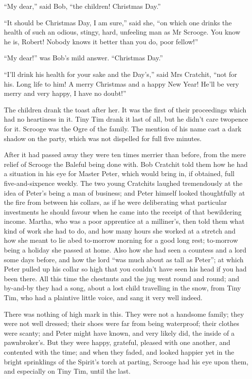 \documentclass[paper=5.5in:8.5in,BCOR=5mm,twoside,DIV=calc,12pt,usegeometry]{scrbook} %
\begin{document}
\enquote{My dear,} said Bob, \enquote{the children! Christmas Day.}

\enquote{It should be Christmas Day, I am sure,} said she, \enquote{on which one drinks the health of such an odious, stingy, hard, unfeeling man as Mr Scrooge. You know he is, Robert! Nobody knows it better than you do, poor fellow!}

\enquote{My dear!} was Bob's mild answer. \enquote{Christmas Day.}

\enquote{I'll drink his health for your sake and the Day's,} said Mrs Cratchit, \enquote{not for his. Long life to him! A merry Christmas and a happy New Year! He'll be very merry and very happy, I have no doubt!}

The children drank the toast after her. It was the first of their proceedings which had no heartiness in it. Tiny Tim drank it last of all, but he didn't care twopence for it. Scrooge was the Ogre of the family. The mention of his name cast a dark shadow on the party, which was not dispelled for full five minutes.

After it had passed away they were ten times merrier than before, from the mere relief of Scrooge the Baleful being done with. Bob Cratchit told them how he had a situation in his eye for Master Peter, which would bring in, if obtained, full five-and-sixpence weekly. The two young Cratchits laughed tremendously at the idea of Peter's being a man of business; and Peter himself looked thoughtfully at the fire from between his collars, as if he were deliberating what particular investments he should favour when he came into the receipt of that bewildering income. Martha, who was a poor apprentice at a milliner's, then told them what kind of work she had to do, and how many hours she worked at a stretch and how she meant to lie abed to-morrow morning for a good long rest; to-morrow being a holiday she passed at home. Also how she had seen a countess and a lord some days before, and how the lord \enquote{was much about as tall as Peter}; at which Peter pulled up his collar so high that you couldn't have seen his head if you had been there. All this time the chestnuts and the jug went round and round; and by-and-by they had a song, about a lost child travelling in the snow, from Tiny Tim, who had a plaintive little voice, and sang it very well indeed.

There was nothing of high mark in this. They were not a handsome family; they were not well dressed; their shoes were far from being waterproof; their clothes were scanty; and Peter might have known, and very likely did, the inside of a pawnbroker's. But they were happy, grateful, pleased with one another, and contented with the time; and when they faded, and looked happier yet in the bright sprinklings of the Spirit's torch at parting, Scrooge had his eye upon them, and especially on Tiny Tim, until the last.
\end{document}

